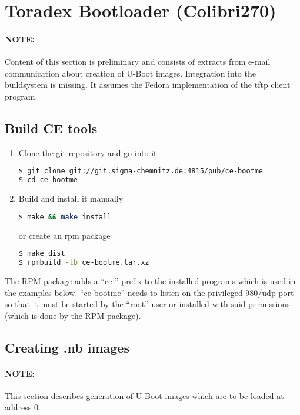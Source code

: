 \section{Toradex Bootloader (Colibri270)}

\paragraph{NOTE:} Content of this section is preliminary and consists
of extracts from e-mail communication about creation of U-Boot images.
Integration into the buildsystem is missing.  It assumes the Fedora
implementation of the tftp client program.

\subsection{Build CE tools}

\begin{enumerate}
\item Clone the git repository and go into it
\begin{lstlisting}[language=sh]
$ git clone git://git.sigma-chemnitz.de:4815/pub/ce-bootme
$ cd ce-bootme
\end{lstlisting}
\item Build and install it manually
\begin{lstlisting}[language=sh]
$ make && make install
\end{lstlisting}%
or create an rpm package
\begin{lstlisting}[language=sh]
$ make dist
$ rpmbuild -tb ce-bootme.tar.xz
\end{lstlisting}
\end{enumerate}

The RPM package adds a ``ce-'' prefix to the installed programs which
is used in the examples below. ``ce-bootme'' needs to listen on the
privileged 980/udp port so that it must be started by the ``root''
user or installed with suid permissions (which is done by the RPM
package).

\subsection{Creating .nb images}

\paragraph{NOTE:} This section describes generation of U-Boot images
which are to be loaded at address 0.

